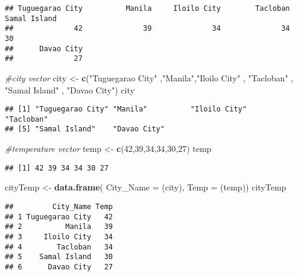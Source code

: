 \documentclass[
]{article}
\newenvironment{Shaded}{\begin{snugshade}}{\end{snugshade}}
\newcommand{\AttributeTok}[1]{\textcolor[rgb]{0.13,0.29,0.53}{#1}}
\newcommand{\CommentTok}[1]{\textcolor[rgb]{0.56,0.35,0.01}{\textit{#1}}}
\newcommand{\DecValTok}[1]{\textcolor[rgb]{0.00,0.00,0.81}{#1}}
\newcommand{\FunctionTok}[1]{\textcolor[rgb]{0.13,0.29,0.53}{\textbf{#1}}}
\newcommand{\NormalTok}[1]{#1}
\newcommand{\OtherTok}[1]{\textcolor[rgb]{0.56,0.35,0.01}{#1}}
\newcommand{\StringTok}[1]{\textcolor[rgb]{0.31,0.60,0.02}{#1}}
\begin{document}
\begin{verbatim}
## Tuguegarao City          Manila     Iloilo City        Tacloban    Samal Island 
##              42              39              34              34              30 
##      Davao City 
##              27
\end{verbatim}

\begin{Shaded}
\begin{Highlighting}[]
\CommentTok{\#city vector}
\NormalTok{city }\OtherTok{\textless{}{-}} \FunctionTok{c}\NormalTok{(}\StringTok{"Tuguegarao City"}\NormalTok{ ,}\StringTok{"Manila"}\NormalTok{,}\StringTok{"Iloilo City"}\NormalTok{ , }\StringTok{"Tacloban"}\NormalTok{ , }\StringTok{"Samal Island"}\NormalTok{  , }\StringTok{"Davao City"}\NormalTok{)}
\NormalTok{city}
\end{Highlighting}
\end{Shaded}

\begin{verbatim}
## [1] "Tuguegarao City" "Manila"          "Iloilo City"     "Tacloban"       
## [5] "Samal Island"    "Davao City"
\end{verbatim}

\begin{Shaded}
\begin{Highlighting}[]
\CommentTok{\#temperature vector}
\NormalTok{temp }\OtherTok{\textless{}{-}} \FunctionTok{c}\NormalTok{(}\DecValTok{42}\NormalTok{,}\DecValTok{39}\NormalTok{,}\DecValTok{34}\NormalTok{,}\DecValTok{34}\NormalTok{,}\DecValTok{30}\NormalTok{,}\DecValTok{27}\NormalTok{)}
\NormalTok{temp}
\end{Highlighting}
\end{Shaded}

\begin{verbatim}
## [1] 42 39 34 34 30 27
\end{verbatim}

\begin{Shaded}
\begin{Highlighting}[]
\NormalTok{cityTemp }\OtherTok{\textless{}{-}} \FunctionTok{data.frame}\NormalTok{(}
  \AttributeTok{City\_Name =}\NormalTok{ (city),}
  \AttributeTok{Temp =}\NormalTok{ (temp))}
\NormalTok{cityTemp}
\end{Highlighting}
\end{Shaded}

\begin{verbatim}
##         City_Name Temp
## 1 Tuguegarao City   42
## 2          Manila   39
## 3     Iloilo City   34
## 4        Tacloban   34
## 5    Samal Island   30
## 6      Davao City   27
\end{verbatim}
\end{document}
